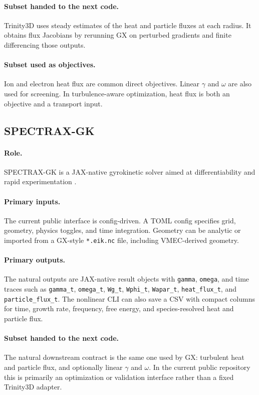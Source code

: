\documentclass[11pt]{article}
\newcommand{\code}[1]{\texttt{#1}}
\begin{document}
\paragraph{Subset handed to the next code.}
Trinity3D uses steady estimates of the heat and particle fluxes at each radius.
It obtains flux Jacobians by rerunning GX on perturbed gradients and finite
differencing those outputs.

\paragraph{Subset used as objectives.}
Ion and electron heat flux are common direct objectives. Linear
\(\gamma\) and \(\omega\) are also used for screening. In turbulence-aware
optimization, heat flux is both an objective and a transport input.

\subsection{SPECTRAX-GK}

\paragraph{Role.}
SPECTRAX-GK is a JAX-native gyrokinetic solver aimed at differentiability and
rapid experimentation \citep{SpectraxGKRepo}.

\paragraph{Primary inputs.}
The current public interface is config-driven. A TOML config specifies grid,
geometry, physics toggles, and time integration. Geometry can be analytic or
imported from a GX-style \code{*.eik.nc} file, including VMEC-derived geometry.

\paragraph{Primary outputs.}
The natural outputs are JAX-native result objects with \code{gamma},
\code{omega}, and time traces such as \code{gamma\_t}, \code{omega\_t},
\code{Wg\_t}, \code{Wphi\_t}, \code{Wapar\_t}, \code{heat\_flux\_t}, and
\code{particle\_flux\_t}. The nonlinear CLI can also save a CSV with compact
columns for time, growth rate, frequency, free energy, and species-resolved
heat and particle flux.

\paragraph{Subset handed to the next code.}
The natural downstream contract is the same one used by GX: turbulent heat and
particle flux, and optionally linear \(\gamma\) and \(\omega\). In the current
public repository this is primarily an optimization or validation interface
rather than a fixed Trinity3D adapter.
\end{document}
